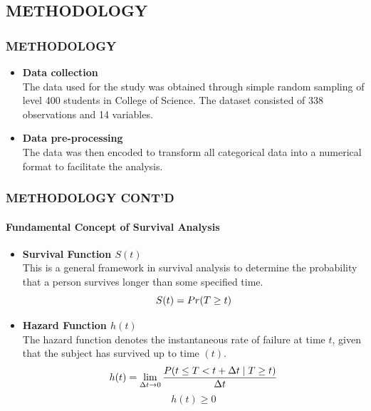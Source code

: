 \documentclass[12pt]{beamer}
\begin{document}
	
	\begin{frame}
 	\section{METHODOLOGY}

		\frametitle{METHODOLOGY}
		\begin{itemize}
			\item \textbf{Data collection}\\
The data used for the study was obtained through simple random sampling of level 400 students in College of Science. The dataset consisted of  338 observations and 14 variables. 
	
   		\vspace{0.3cm}

			\item \textbf{Data pre-processing}\\
The data was then encoded to transform all categorical data into a numerical format to facilitate the analysis.

   	\end{itemize}
    \end{frame}


\begin{frame}

		\frametitle{METHODOLOGY CONT'D}
    \framesubtitle{Fundamental Concept of Survival Analysis}  
		\begin{itemize}
            \item  \textbf{Survival Function $S(t)$ }\\
This is a general framework in survival analysis to determine the probability that a person survives longer than some specified time.
\begin{equation}\scriptsize
    S(t) = Pr{(T \geq t)}
\end{equation}
    \item \textbf{Hazard Function $h(t)$}\\
   The hazard function denotes the instantaneous rate of failure at time $t$, given that the subject has survived up to time $(t)$. 
 \begin{equation} \scriptsize
h(t) = \lim_{\Delta t \to 0} \frac{P(t \le T < t + \Delta t \mid T \geq t)}{\Delta t}
\end{equation}
\scriptsize $$h\left(t\right)\geq0$$

   	\end{itemize}

    \end{frame}
 
\end{document}
